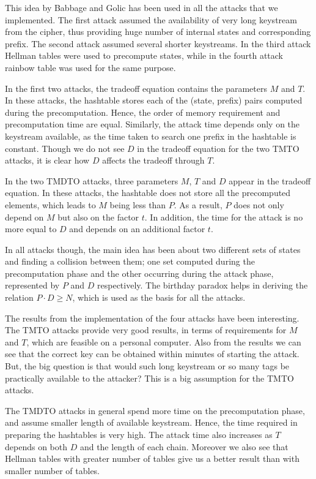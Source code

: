 This idea by Babbage and Golic has been used in all the attacks that we implemented. The first attack assumed the availability of very long keystream from the cipher, thus providing huge number of internal states and corresponding prefix. The second attack assumed several shorter keystreams. In the third attack Hellman tables were used to precompute states, while in the fourth attack rainbow table was used for the same purpose. 

In the first two attacks, the tradeoff equation contains the parameters $M$ and $T$. In these attacks, the hashtable stores each of the (state, prefix) pairs computed during the precomputation. Hence, the order of memory requirement and precomputation time are equal. Similarly, the attack time depends only on the keystream available, as the time taken to search one prefix in the hashtable is constant. Though we do not see $D$ in the tradeoff equation for the two TMTO attacks, it is clear how $D$ affects the tradeoff through $T$.

In the two TMDTO attacks, three parameters $M$, $T$ and $D$ appear in the tradeoff equation. In these attacks, the hashtable does not store all the precomputed elements, which leads to $M$ being less than $P$. As a result, $P$ does not only depend on $M$ but also on the factor $t$. In addition, the time for the attack is no more equal to $D$ and depends on an additional factor $t$. 

In all attacks though, the main idea has been about two different sets of states and finding a collision between them; one set computed during the precomputation phase and the other occurring during the attack phase, represented by $P$ and $D$ respectively. The birthday paradox helps in deriving the relation $P \cdot D \geq N$, which is used as the basis for all the attacks. 

The results from the implementation of the four attacks have been interesting. The TMTO attacks provide very good results, in terms of requirements for $M$ and $T$, which are feasible on a personal computer. Also from the results we can see that the correct key can be obtained within minutes of starting the attack. But, the big question is that would such long keystream or so many tags be practically available to the attacker? This is a big assumption for the TMTO attacks.

The TMDTO attacks in general spend more time on the precomputation phase, and assume smaller length of available keystream. Hence, the time required in preparing the hashtables is very high. The attack time also increases as $T$ depends on both $D$ and the length of each chain. Moreover we also see that Hellman tables with greater number of tables give us a better result than with smaller number of tables. 

